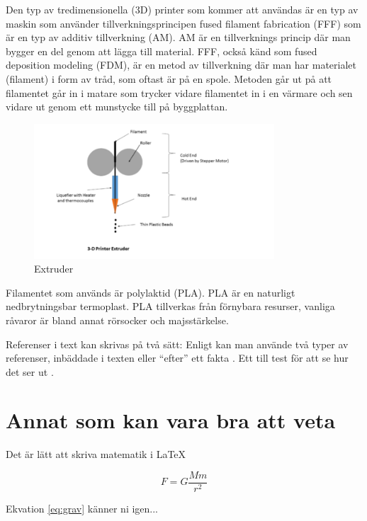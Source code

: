 \documentclass[11p]{article}
\begin{document}
Den typ av tredimensionella (3D) printer som kommer att användas är en typ av maskin som använder tillverkningsprincipen fused filament fabrication (FFF) som är en typ av additiv tillverkning (AM).
AM är en tillverknings princip där man bygger en del genom att lägga till material.
FFF, också känd som fused deposition modeling (FDM), är en metod av tillverkning där man har materialet (filament) i form av tråd, som oftast är på en spole. \textcite{3D_printable}
Metoden går ut på att filamentet går in i matare som trycker vidare filamentet in i en värmare och sen vidare ut genom ett munstycke till på byggplattan.
\begin{figure}[!h]
    \includegraphics[width=0.8\textwidth]{3D_Printer_Extruder.png}
    \caption{Extruder}
    \label{fig:extruder}
\end{figure}

Filamentet som används är polylaktid (PLA).
PLA är en naturligt nedbrytningsbar termoplast.
PLA tillverkas från förnybara resurser, vanliga råvaror är bland annat rörsocker och majsstärkelse.

Referenser i text kan skrivas på två sätt: Enligt \textcite{} kan man använde två typer av referenser, inbäddade i texten eller ``efter'' ett fakta \parencite{Fraenkel}. Ett till test för att se hur det ser ut \parencite{fermi}.

\section{Annat som kan vara bra att veta}
Det är lätt att skriva matematik i \LaTeX

\begin{equation}
    F = G \frac{M m}{r^2}
    \label{eq:grav}
\end{equation}

Ekvation \eqref{eq:grav} känner ni igen...
\clearpage
\end{document}
